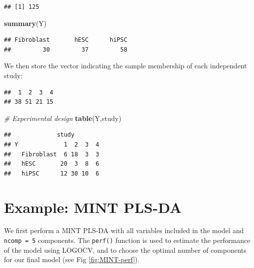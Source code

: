 \documentclass[]{book}
\newenvironment{Shaded}{\begin{snugshade}}{\end{snugshade}}
\newcommand{\CommentTok}[1]{\textcolor[rgb]{0.56,0.35,0.01}{\textit{#1}}}
\newcommand{\KeywordTok}[1]{\textcolor[rgb]{0.13,0.29,0.53}{\textbf{#1}}}
\newcommand{\NormalTok}[1]{#1}
\newcommand{\OperatorTok}[1]{\textcolor[rgb]{0.81,0.36,0.00}{\textbf{#1}}}
\newcommand{\StringTok}[1]{\textcolor[rgb]{0.31,0.60,0.02}{#1}}
\begin{document}
\begin{verbatim}
## [1] 125
\end{verbatim}

\begin{Shaded}
\begin{Highlighting}[]
\KeywordTok{summary}\NormalTok{(Y)}
\end{Highlighting}
\end{Shaded}

\begin{verbatim}
## Fibroblast       hESC      hiPSC 
##         30         37         58
\end{verbatim}

We then store the vector indicating the sample membership of each independent study:

\begin{Shaded}
\end{Shaded}

\begin{verbatim}
##  1  2  3  4 
## 38 51 21 15
\end{verbatim}

\begin{Shaded}
\begin{Highlighting}[]
\CommentTok{# Experimental design}
\KeywordTok{table}\NormalTok{(Y,study)}
\end{Highlighting}
\end{Shaded}

\begin{verbatim}
##             study
## Y             1  2  3  4
##   Fibroblast  6 18  3  3
##   hESC       20  3  8  6
##   hiPSC      12 30 10  6
\end{verbatim}

\hypertarget{mint:plsda}{%
\section{Example: MINT PLS-DA}\label{mint:plsda}}

We first perform a MINT PLS-DA with all variables included in the model and \texttt{ncomp\ =\ 5} components. The \texttt{perf()} function is used to estimate the performance of the model using LOGOCV, and to choose the optimal number of components for our final model (see Fig \ref{fig:MINT-perf}).
\end{document}

